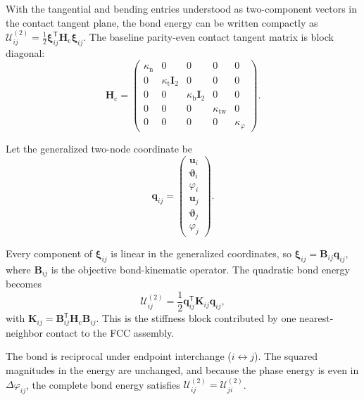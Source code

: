 With the tangential and bending entries understood as two-component vectors in the contact tangent plane, the bond energy can be written compactly as $\mathcal{U}_{ij}^{(2)} = \frac{1}{2} \boldsymbol{\xi}_{ij}^{\mathsf{T}} \mathbf{H}_{\mathrm{c}} \boldsymbol{\xi}_{ij}$. The baseline parity-even contact tangent matrix is block diagonal:
\begin{equation}
    \mathbf{H}_{\mathrm{c}} =
    \begin{pmatrix}
        \kappa_{\mathrm{n}} & 0 & 0 & 0 & 0 \\
        0 & \kappa_{\mathrm{t}}\mathbf{I}_2 & 0 & 0 & 0 \\
        0 & 0 & \kappa_{\mathrm{b}}\mathbf{I}_2 & 0 & 0 \\
        0 & 0 & 0 & \kappa_{\mathrm{tw}} & 0 \\
        0 & 0 & 0 & 0 & \kappa_\varphi
    \end{pmatrix}.
\end{equation}

Let the generalized two-node coordinate be
\begin{equation}
    \mathbf{q}_{ij} =
    \begin{pmatrix}
        \mathbf{u}_i \\
        \boldsymbol{\vartheta}_i \\
        \varphi_i \\
        \mathbf{u}_j \\
        \boldsymbol{\vartheta}_j \\
        \varphi_j
    \end{pmatrix}.
\end{equation}

Every component of $\boldsymbol{\xi}_{ij}$ is linear in the generalized coordinates, so $\boldsymbol{\xi}_{ij} = \mathbf{B}_{ij}\mathbf{q}_{ij}$, where $\mathbf{B}_{ij}$ is the objective bond-kinematic operator. The quadratic bond energy becomes
\begin{equation}
    \mathcal{U}_{ij}^{(2)} = \frac{1}{2} \mathbf{q}_{ij}^{\mathsf{T}} \mathbf{K}_{ij} \mathbf{q}_{ij},
\end{equation}
with $\mathbf{K}_{ij} = \mathbf{B}_{ij}^{\mathsf{T}} \mathbf{H}_{\mathrm{c}} \mathbf{B}_{ij}$. This is the stiffness block contributed by one nearest-neighbor contact to the FCC assembly.

The bond is reciprocal under endpoint interchange ($i \leftrightarrow j$). The squared magnitudes in the energy are unchanged, and because the phase energy is even in $\Delta\varphi_{ij}$, the complete bond energy satisfies $\mathcal{U}_{ij}^{(2)} = \mathcal{U}_{ji}^{(2)}$.

